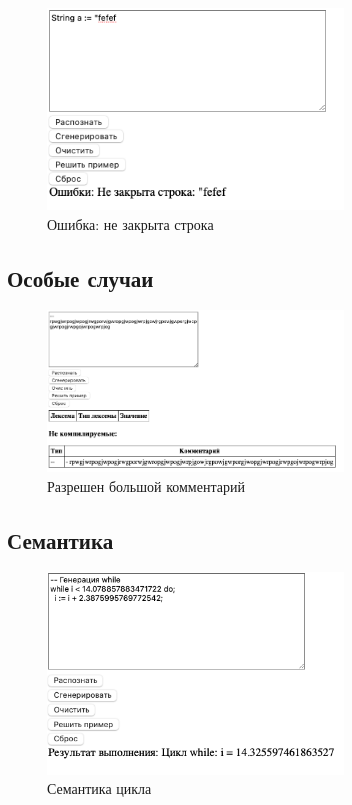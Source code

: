\documentclass[areasetadvanced]{scrartcl}
\begin{document}
\begin{figure}[H]
    \centering
    \includegraphics[width=0.7\textwidth]{StringError.png}
    \caption{Ошибка: не закрыта строка}
    \label{fig:syntdiag}
\end{figure}

\subsection{Особые случаи}
\begin{figure}[H]
    \centering
    \includegraphics[width=0.7\textwidth]{LargeComment.png}
    \caption{Разрешен большой комментарий}
    \label{fig:syntdiag}
\end{figure}

\subsection{Семантика}
\begin{figure}[H]
    \centering
    \includegraphics[width=0.7\textwidth]{WhileSem.png}
    \caption{Семантика цикла}
    \label{fig:syntdiag}
\end{figure}
\end{document}
